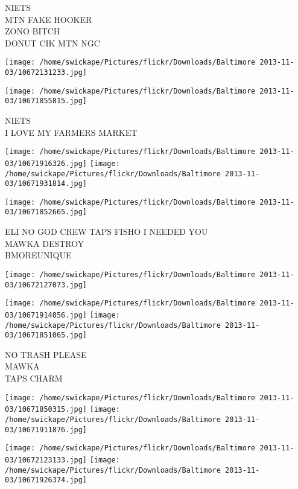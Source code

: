 \documentclass[10pt,letterpaper]{article}
\begin{document}
NIETS\\
MTN FAKE HOOKER\\
ZONO BITCH\\
DONUT CIK MTN NGC\\
\pagebreak

\texttt{[image: /home/swickape/Pictures/flickr/Downloads/Baltimore 2013-11-03/10672131233.jpg]}

\vspace{0.25in}
\texttt{[image: /home/swickape/Pictures/flickr/Downloads/Baltimore 2013-11-03/10671855815.jpg]}

NIETS\\
I LOVE MY FARMERS MARKET\\
\pagebreak

\texttt{[image: /home/swickape/Pictures/flickr/Downloads/Baltimore 2013-11-03/10671916326.jpg]}
\texttt{[image: /home/swickape/Pictures/flickr/Downloads/Baltimore 2013-11-03/10671931814.jpg]}

\texttt{[image: /home/swickape/Pictures/flickr/Downloads/Baltimore 2013-11-03/10671852665.jpg]}

ELI NO GOD CREW TAPS FISHO I NEEDED YOU\\
MAWKA DESTROY\\
BMOREUNIQUE\\
\pagebreak

\texttt{[image: /home/swickape/Pictures/flickr/Downloads/Baltimore 2013-11-03/10672127073.jpg]}

\vspace{0.25in}
\texttt{[image: /home/swickape/Pictures/flickr/Downloads/Baltimore 2013-11-03/10671914056.jpg]}
\texttt{[image: /home/swickape/Pictures/flickr/Downloads/Baltimore 2013-11-03/10671851065.jpg]}

NO TRASH PLEASE\\
MAWKA\\
TAPS CHARM\\
\pagebreak

\texttt{[image: /home/swickape/Pictures/flickr/Downloads/Baltimore 2013-11-03/10671850315.jpg]}
\texttt{[image: /home/swickape/Pictures/flickr/Downloads/Baltimore 2013-11-03/10671911876.jpg]}

\texttt{[image: /home/swickape/Pictures/flickr/Downloads/Baltimore 2013-11-03/10672123133.jpg]}
\texttt{[image: /home/swickape/Pictures/flickr/Downloads/Baltimore 2013-11-03/10671926374.jpg]}
\end{document}
